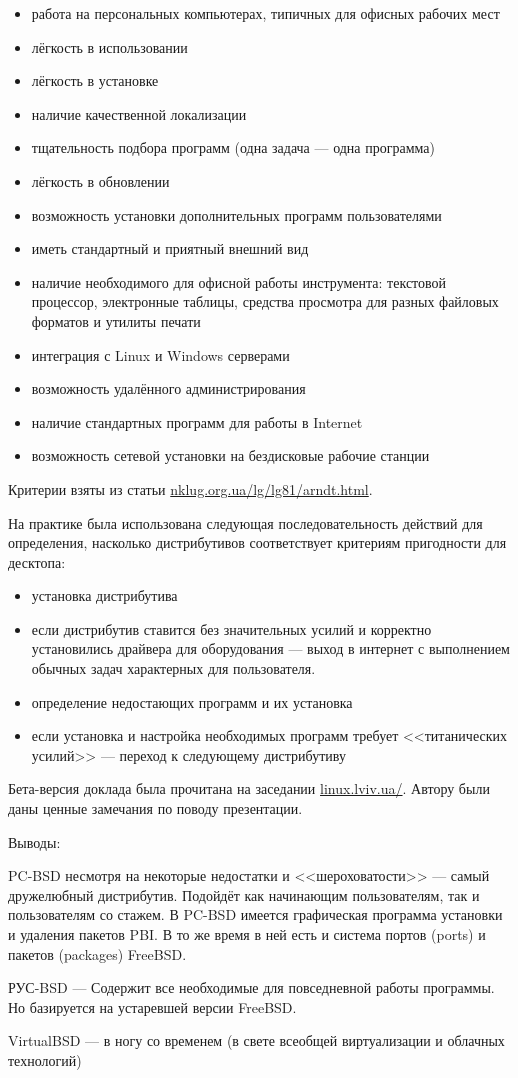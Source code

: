 \documentclass[10pt, a5paper]{article}
\begin{document}
\begin{itemize}
  \item работа на персональных компьютерах, типичных для офисных рабочих
         мест
  \item лёгкость в использовании
  \item лёгкость в установке
  \item наличие качественной локализации
  \item тщательность подбора программ (одна задача --- одна программа)
  \item лёгкость в обновлении
  \item возможность установки дополнительных программ пользователями
  \item иметь стандартный и приятный внешний вид
  \item наличие необходимого для офисной работы инструмента: текстовой процессор, электронные таблицы, средства просмотра для разных файловых форматов и утилиты печати
  \item интеграция с Linux и Windows серверами
  \item возможность удалённого администрирования
  \item наличие стандартных программ для работы в Internet
  \item возможность сетевой установки на бездисковые рабочие станции
\end{itemize}

Критерии взяты из статьи \url{nklug.org.ua/lg/lg81/arndt.html}.

На практике была использована следующая последовательность действий для определения,
насколько дистрибутивов соответствует критериям пригодности для десктопа:

\begin{itemize}
  \item установка дистрибутива
  \item если дистрибутив ставится без значительных усилий и корректно установились драйвера для оборудования --- выход в интернет с выполнением обычных задач характерных для \linebreak пользователя.
  \item определение недостающих программ и их установка
  \item если установка и настройка необходимых программ требует <<титанических усилий>> --- переход к следующему дистрибутиву
\end{itemize}

Бета-версия доклада была прочитана на заседании \url{linux.lviv.ua/}. Автору  были даны ценные замечания по поводу презентации.

Выводы:

PC-BSD несмотря на некоторые недостатки и <<шероховатости>> --- самый дружелюбный дистрибутив. Подойдёт как начинающим пользователям, так и пользователям со стажем. 
В PC-BSD имеется графическая программа установки и удаления пакетов PBI. В то же время в ней есть и система портов (ports) и пакетов (packages) FreeBSD.

РУС-BSD --- Содержит все необходимые для повседневной работы программы. Но базируется на устаревшей версии FreeBSD.

VirtualBSD --- в ногу со временем (в свете всеобщей виртуализации и облачных технологий)
\end{document}
